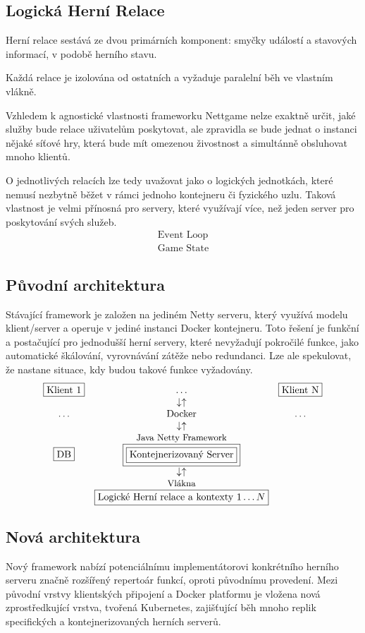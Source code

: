 \documentclass{article}
\begin{document}
\subsection{Logická Herní Relace}
Herní relace sestává ze dvou primárních komponent: smyčky událostí a stavových informací, v podobě herního stavu. 

Každá relace je izolována od ostatních a vyžaduje paralelní běh ve vlastním vlákně.

Vzhledem k agnostické vlastnosti frameworku Nettgame nelze exaktně určit, jaké služby bude relace uživatelům poskytovat, ale zpravidla se bude jednat o instanci nějaké síťové hry, která bude mít omezenou živostnost a simultánně obsluhovat mnoho klientů.

O jednotlivých relacích lze tedy uvažovat jako o logických jednotkách, které nemusí nezbytně běžet v rámci jednoho kontejneru či fyzického uzlu. Taková vlastnost je velmi přínosná pro servery, které využívají více, než jeden server pro poskytování svých služeb.
$$
\boxed{\substack{\boxed{\text{Event Loop}}\\\boxed{\text{Game State}}}}
$$

\subsection{Původní architektura}
Stávající framework je založen na jediném Netty serveru, který využívá modelu klient/server a operuje v jediné instanci Docker kontejneru. Toto řešení je funkční a postačující pro jednodušší herní servery, které nevyžadují pokročilé funkce, jako automatické škálování, vyrovnávání zátěže nebo redundanci. Lze ale spekulovat, že nastane situace, kdy budou takové funkce vyžadovány.
$$
\begin{matrix}
\boxed{\text{Klient 1}}&\ldots&\boxed{\text{Klient N}}\\
&\downarrow\uparrow&\\
\ldots&\text{Docker}&\ldots\\
&\downarrow\uparrow&\\
&\small\text{Java Netty Framework}&\\
\boxed{\text{DB}}&\boxed{\boxed{\text{Kontejnerizovaný Server}}}&\\
&\downarrow\uparrow&\\&\small\text{Vlákna}&\\
&\boxed{\text{Logické Herní relace a kontexty}\text{ }1\ldots N}&
\end{matrix}
$$

\subsection{Nová architektura}
Nový framework nabízí potenciálnímu implementátorovi konkrétního herního serveru značně rozšířený repertoár funkcí, oproti původnímu provedení. Mezi původní vrstvy klientských připojení a Docker platformu je vložena nová zprostředkující vrstva, tvořená Kubernetes, zajišťující běh mnoho replik specifických a kontejnerizovaných herních serverů.
\end{document}
